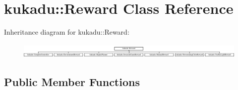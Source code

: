\hypertarget{classkukadu_1_1Reward}{\section{kukadu\-:\-:Reward Class Reference}
\label{classkukadu_1_1Reward}
}
Inheritance diagram for kukadu\-:\-:Reward\-:\begin{figure}[H]
\begin{center}
\leavevmode
\includegraphics[height=0.751174cm]{classkukadu_1_1Reward}
\end{center}
\end{figure}
\subsection*{Public Member Functions}
